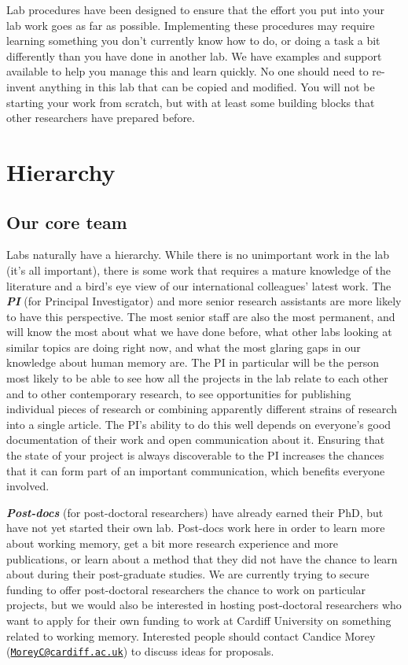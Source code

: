 \documentclass[
  12pt,
]{book}
\begin{document}
Lab procedures have been designed to ensure that the effort you put into your lab work goes as far as possible. Implementing these procedures may require learning something you don't currently know how to do, or doing a task a bit differently than you have done in another lab. We have examples and support available to help you manage this and learn quickly. No one should need to re-invent anything in this lab that can be copied and modified. You will not be starting your work from scratch, but with at least some building blocks that other researchers have prepared before.

\section{Hierarchy}\label{hierarchy}

\subsection{Our core team}\label{our-core-team}

Labs naturally have a hierarchy. While there is no unimportant work in the lab (it's all important), there is some work that requires a mature knowledge of the literature and a bird's eye view of our international colleagues' latest work. The \textbf{\emph{PI}} (for Principal Investigator) and more senior research assistants are more likely to have this perspective. The most senior staff are also the most permanent, and will know the most about what we have done before, what other labs looking at similar topics are doing right now, and what the most glaring gaps in our knowledge about human memory are. The PI in particular will be the person most likely to be able to see how all the projects in the lab relate to each other and to other contemporary research, to see opportunities for publishing individual pieces of research or combining apparently different strains of research into a single article. The PI's ability to do this well depends on everyone's good documentation of their work and open communication about it. Ensuring that the state of your project is always discoverable to the PI increases the chances that it can form part of an important communication, which benefits everyone involved.

\textbf{\emph{Post-docs}} (for post-doctoral researchers) have already earned their PhD, but have not yet started their own lab. Post-docs work here in order to learn more about working memory, get a bit more research experience and more publications, or learn about a method that they did not have the chance to learn about during their post-graduate studies. We are currently trying to secure funding to offer post-doctoral researchers the chance to work on particular projects, but we would also be interested in hosting post-doctoral researchers who want to apply for their own funding to work at Cardiff University on something related to working memory. Interested people should contact Candice Morey (\href{mailto:MoreyC@cardiff.ac.uk}{\nolinkurl{MoreyC@cardiff.ac.uk}}) to discuss ideas for proposals.
\end{document}
